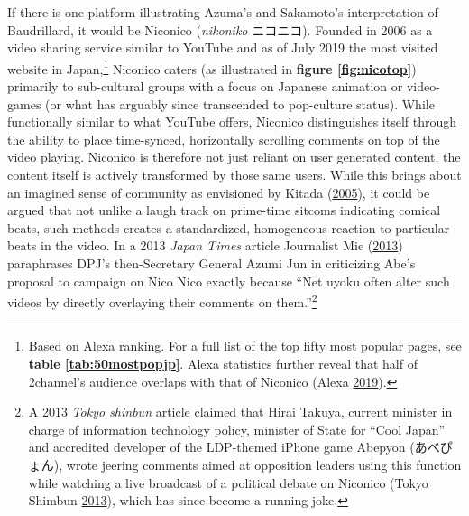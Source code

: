 \documentclass[10pt,british,A4paper,,openany]{memoir}
\begin{document}
If there is one platform illustrating Azuma's and Sakamoto's
interpretation of Baudrillard, it would be Niconico (\emph{nikoniko}
ニコニコ). Founded in 2006 as a video sharing service similar to YouTube
and as of July 2019 the  most visited website in
Japan,\footnote{Based on Alexa ranking. For a full list of the top fifty
  most popular pages, see \textbf{table \ref{tab:50mostpopjp}}. Alexa
  statistics further reveal that half of 2channel's audience overlaps
  with that of Niconico (Alexa
  \protect\hyperlink{ref-alexa_alexa_2019}{2019}).} Niconico caters (as
illustrated in \textbf{figure \ref{fig:nicotop}}) primarily to
sub-cultural groups with a focus on Japanese animation or video-games
(or what has arguably since transcended to pop-culture status). While
functionally similar to what YouTube offers, Niconico distinguishes
itself through the ability to place time-synced, horizontally scrolling
comments on top of the video playing. Niconico is therefore not just
reliant on user generated content, the content itself is actively
transformed by those same users. While this brings about an imagined
sense of community as envisioned by Kitada
(\protect\hyperlink{ref-kitada_eng:_2005}{2005}), it could be argued
that not unlike a laugh track on prime-time sitcoms indicating comical
beats, such methods creates a standardized, homogeneous reaction to
particular beats in the video. In a 2013 \emph{Japan Times} article
Journalist Mie (\protect\hyperlink{ref-mie_xenophobia_2013}{2013})
paraphrases DPJ's then-Secretary General Azumi Jun in criticizing Abe's
proposal to campaign on Nico Nico exactly because ``Net uyoku often
alter such videos by directly overlaying their comments on
them.''\footnote{A 2013 \emph{Tokyo shinbun} article claimed that Hirai
  Takuya, current minister in charge of information technology policy,
  minister of State for ``Cool Japan'' and accredited developer of the
  LDP-themed iPhone game Abepyon (あべぴょん), wrote jeering comments
  aimed at opposition leaders using this function while watching a live
  broadcast of a political debate on Niconico (Tokyo Shimbun
  \protect\hyperlink{ref-tokyo_shimbun_tokyo_2013}{2013}), which has
  since become a running joke.}
\end{document}
